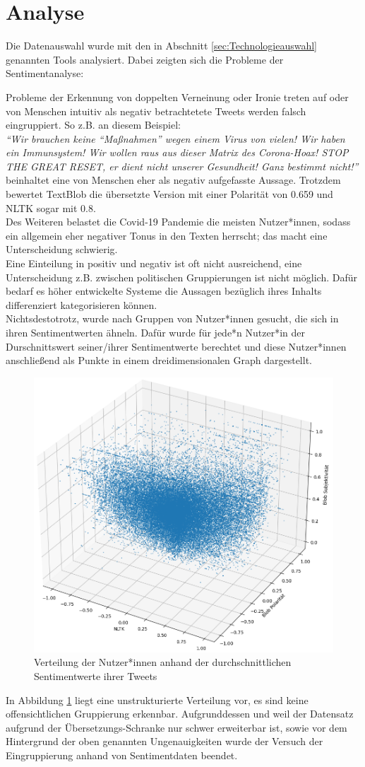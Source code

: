 \section{Analyse}
\label{sentiment-daten-analyse}
Die Datenauswahl wurde mit den in Abschnitt \ref{sec:Technologieauswahl} genannten Tools analysiert. Dabei zeigten sich die Probleme der Sentimentanalyse:

Probleme der Erkennung von doppelten Verneinung oder Ironie treten auf oder von Menschen intuitiv als negativ betrachtetete Tweets werden falsch eingruppiert.
So z.B. an diesem Beispiel:\\
\textit{"`Wir brauchen keine "`Maßnahmen"' wegen einem Virus von vielen! Wir haben ein Immunsystem! Wir wollen raus aus dieser Matrix des Corona-Hoax! STOP THE GREAT RESET, er dient nicht unserer Gesundheit! Ganz bestimmt nicht!"'} \\beinhaltet eine von Menschen eher als negativ aufgefasste Aussage. Trotzdem bewertet TextBlob die übersetzte Version mit einer Polarität von 0.659 und NLTK sogar mit 0.8. \\
Des Weiteren belastet die Covid-19 Pandemie  die meisten Nutzer*innen, sodass ein allgemein eher negativer Tonus in den Texten herrscht; das macht eine Unterscheidung schwierig.\\ 
Eine Einteilung in positiv und negativ ist oft nicht ausreichend, eine Unterscheidung z.B. zwischen politischen Gruppierungen ist nicht möglich.
Dafür bedarf es höher entwickelte Systeme die Aussagen bezüglich ihres Inhalts differenziert kategorisieren können.\\
Nichtsdestotrotz, wurde nach Gruppen von Nutzer*innen gesucht, die sich in ihren Sentimentwerten ähneln. 
Dafür wurde für jede*n Nutzer*in der Durschnittswert seiner/ihrer Sentimentwerte berechtet und diese Nutzer*innen anschließend als Punkte in einem dreidimensionalen Graph dargestellt.
\begin{figure}[h!]
	\centering
	\includegraphics[width=0.5\linewidth]{images/SentimentPlot}
	\caption[]{Verteilung der Nutzer*innen anhand der durchschnittlichen Sentimentwerte ihrer Tweets}
	\label{fig:sentimentplot}
\end{figure}

In Abbildung \ref{fig:sentimentplot}  liegt eine unstrukturierte Verteilung vor, es sind keine offensichtlichen Gruppierung erkennbar.
Aufgrunddessen und weil der Datensatz aufgrund der Übersetzungs-Schranke nur schwer erweiterbar ist, sowie vor dem Hintergrund der oben genannten Ungenauigkeiten wurde der Versuch der Eingruppierung anhand von Sentimentdaten beendet.

